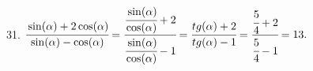 31. $\cfrac{\sin(\alpha)+2\cos(\alpha)}{\sin(\alpha)-\cos(\alpha)}=\cfrac{\cfrac{\sin(\alpha)}{\cos(\alpha)}+2}{\cfrac{\sin(\alpha)}{\cos(\alpha)}-1}=
\cfrac{tg(\alpha)+2}{tg(\alpha)-1}=\cfrac{\cfrac{5}{4}+2}{\cfrac{5}{4}-1}=13.$
\newpage
